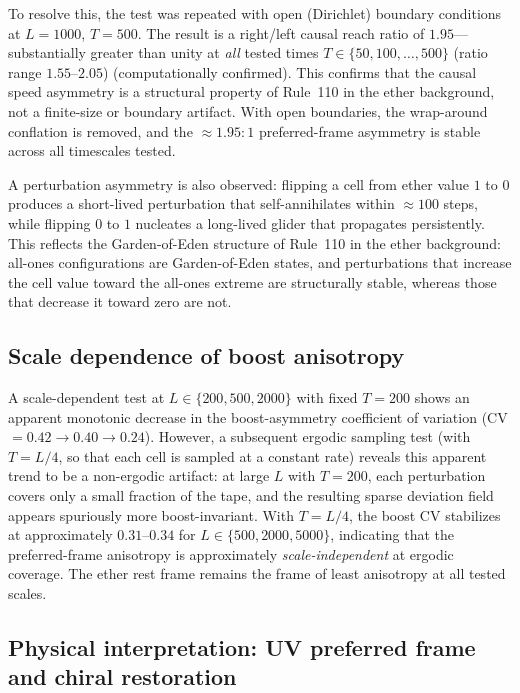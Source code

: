 \documentclass[11pt]{article}
\theoremstyle{remark}
\newcommand{\CatA}{computationally confirmed}
\begin{document}
To resolve this, the test was repeated with open (Dirichlet) boundary
conditions at $L = 1000$, $T = 500$.
The result is a right/left causal reach ratio of $1.95$---substantially
greater than unity at \emph{all} tested times $T \in \{50, 100, \ldots, 500\}$
(ratio range $1.55$--$2.05$) (\CatA).
This confirms that the causal speed asymmetry is a structural property
of Rule~110 in the ether background, not a finite-size or boundary artifact.
With open boundaries, the wrap-around conflation is removed, and the
$\approx 1.95:1$ preferred-frame asymmetry is stable across all timescales
tested.

A perturbation asymmetry is also observed: flipping a cell from ether value
$1$ to $0$ produces a short-lived perturbation that self-annihilates within
$\approx 100$ steps, while flipping $0$ to $1$ nucleates a long-lived glider
that propagates persistently.
This reflects the Garden-of-Eden structure of Rule~110 in the ether
background: all-ones configurations are Garden-of-Eden states, and
perturbations that increase the cell value toward the all-ones extreme are
structurally stable, whereas those that decrease it toward zero are not.

\subsection{Scale dependence of boost anisotropy}
\label{ssec:lorentz_scale}

A scale-dependent test at $L \in \{200, 500, 2000\}$ with fixed $T = 200$
shows an apparent monotonic decrease in the boost-asymmetry coefficient of
variation (CV $= 0.42 \to 0.40 \to 0.24$).
However, a subsequent ergodic sampling test (with $T = L/4$, so that each
cell is sampled at a constant rate) reveals this apparent trend to be a
non-ergodic artifact: at large $L$ with $T = 200$, each perturbation covers
only a small fraction of the tape, and the resulting sparse deviation field
appears spuriously more boost-invariant.
With $T = L/4$, the boost CV stabilizes at approximately $0.31$--$0.34$
for $L \in \{500, 2000, 5000\}$, indicating that the preferred-frame
anisotropy is approximately \emph{scale-independent} at ergodic coverage.
The ether rest frame remains the frame of least anisotropy at all tested
scales.

\subsection{Physical interpretation: UV preferred frame and chiral restoration}
\label{ssec:lorentz_chiral}
\end{document}
